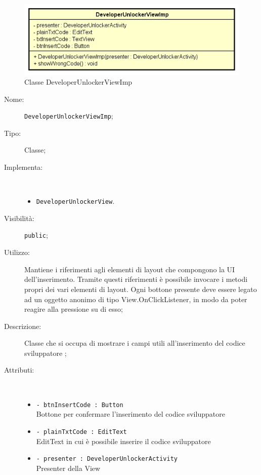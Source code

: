 \documentclass[../DefinizioneDiProdotto.tex]{subfiles}
\begin{document}
    \begin{figure}[H]
        \centering
        \includegraphics{img/DeveloperUnlockerViewImp.png}
        \caption{Classe DeveloperUnlockerViewImp}\label{fig:view::DeveloperUnlockerViewImp} 
    \end{figure}
    \begin{description}
\item[Nome:] \texttt{DeveloperUnlockerViewImp};
\item[Tipo:] Classe;
\item[Implementa:] \
\begin{itemize}
\item \texttt{DeveloperUnlockerView}.

\end{itemize}
\item[Visibilità:] \texttt{public};
\item[Utilizzo:] Mantiene i riferimenti agli elementi di layout che compongono la UI dell'inserimento. Tramite questi riferimenti è possibile invocare i metodi propri dei vari elementi di layout. Ogni bottone presente deve essere legato ad un oggetto anonimo di tipo View.OnClickListener, in modo da poter reagire alla pressione su di esso;
\item[Descrizione:] Classe che si occupa di mostrare i campi utili all'inserimento del codice sviluppatore
;
\item[Attributi:] \
\begin{itemize}
\item \texttt{- btnInsertCode : Button}\\
Bottone per confermare l'inserimento del codice sviluppatore

\item \texttt{- plainTxtCode : EditText}\\
EditText in cui è possibile inserire il codice sviluppatore

\item \texttt{- presenter : DeveloperUnlockerActivity}\\
Presenter della View


\end{itemize}
\end{description}
\end{document}
